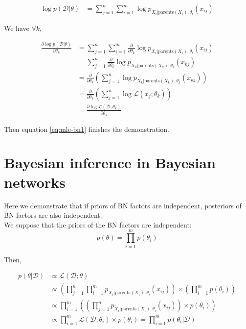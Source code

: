 \documentclass[12pt, a4paper]{article}
\theoremstyle{definition}
\numberwithin{figure}{section}
\numberwithin{equation}{section}
\numberwithin{table}{section}
\begin{document}
\begin{align}
\log p(\mathcal{D}|\theta)
&= \sum_{j=1}^n \sum_{i=1}^m \log p_{X_i|\text{parents}(X_i),\theta_i}(x_{ij})
\end{align}

We have $\forall k$,

\begin{align}
\frac{\partial\log p(\mathcal{D}|\theta)}{\partial \theta_k}
&= \sum_{j=1}^n \sum_{i=1}^m \frac{\partial}{\partial \theta_k}\log p_{X_i|\text{parents}(X_i),\theta_i}(x_{ij})\\
&= \sum_{j=1}^n \frac{\partial}{\partial \theta_k}\log p_{X_k|\text{parents}(X_k),\theta_k}(x_{kj})\\
&= \frac{\partial}{\partial \theta_k} \left( \sum_{j=1}^n \log p_{X_k|\text{parents}(X_k),\theta_k}(x_{kj}) \right)\\
&= \frac{\partial}{\partial \theta_k} \left( \sum_{j=1}^n \log \mathcal{L}(x_j; \theta_k) \right)\\
    &= \frac{\partial \log \mathcal{L}(\mathcal{D}; \theta_k)}{\partial \theta_k}
\end{align}

Then equation \ref{eq:mle-bn1} finishes the demonstration.

\section{Bayesian inference in Bayesian networks}
Here we demonstrate that if priors of BN factors are independent, posteriors of BN factors are also independent.\\

We suppose that the priors of the BN factors are independent:
\begin{equation}
p(\theta)=\prod_{i=1}^m p(\theta_i)
\end{equation}

Then,

\begin{align}
p(\theta|\mathcal{D})
    &\propto \mathcal{L}(\mathcal{D}; \theta)\\
    &\propto \left(\prod_{j=1}^n \prod_{i=1}^m p_{X_i|\text{parents}(X_i),\theta_i}(x_{ij})\right) \times \left(\prod_{i=1}^m p(\theta_i)\right)\\
    &\propto \prod_{i=1}^m \left(\left(\prod_{j=1}^n  p_{X_i|\text{parents}(X_i),\theta_i}(x_{ij})\right) \times p(\theta_i)\right)\\
    &\propto \prod_{i=1}^m \mathcal{L}({\mathcal{D}; \theta_i}) \times p(\theta_i) = \prod_{i=1}^m p({\theta_i|\mathcal{D}})
\end{align}
\end{document}
